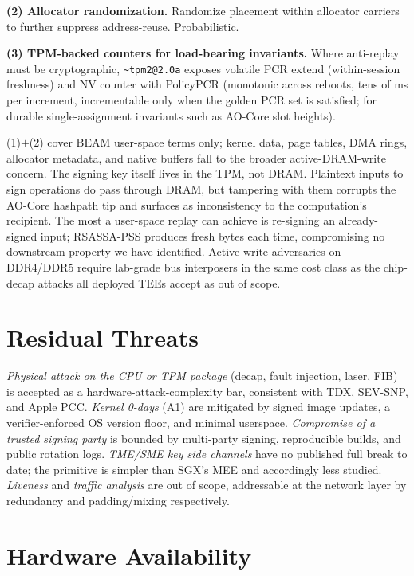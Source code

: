 \documentclass[10pt,a4paper]{article}
\begin{document}
\textbf{(2) Allocator randomization.} Randomize placement within
allocator carriers to further suppress address-reuse. Probabilistic.

\textbf{(3) TPM-backed counters for load-bearing invariants.} Where
anti-replay must be cryptographic, \texttt{\~{}tpm2@2.0a} exposes
volatile PCR extend (within-session freshness) and NV counter with
PolicyPCR (monotonic across reboots, tens of ms per increment,
incrementable
only when the golden PCR set is satisfied; for durable single-assignment
invariants such as AO-Core slot heights).

(1)$+$(2) cover BEAM user-space terms only; kernel data, page tables,
DMA rings, allocator metadata, and native buffers fall to the broader
active-DRAM-write concern. The signing key itself lives in the TPM, not
DRAM. Plaintext inputs to sign operations do pass through DRAM, but
tampering with them corrupts the AO-Core hashpath tip and surfaces as
inconsistency to the computation's recipient. The most a user-space
replay can achieve is re-signing an already-signed input; RSASSA-PSS
produces fresh bytes each time, compromising no downstream property
we have identified. Active-write adversaries on DDR4/DDR5 require
lab-grade bus interposers in the same cost class as the chip-decap
attacks all deployed TEEs accept as out of scope.

\vspace{-0.3em}
\section{Residual Threats}
\vspace{-0.3em}

\emph{Physical attack on the CPU or TPM package} (decap, fault injection,
laser, FIB) is accepted as a hardware-attack-complexity bar, consistent
with TDX, SEV-SNP, and Apple PCC. \emph{Kernel 0-days} (A1) are mitigated
by signed image updates, a verifier-enforced OS version floor, and minimal
userspace. \emph{Compromise of a trusted signing party} is bounded by
multi-party signing, reproducible builds, and public rotation logs.
\emph{TME/SME key side channels} have no published full break to date; the
primitive is simpler than SGX's MEE and accordingly less studied.
\emph{Liveness} and \emph{traffic analysis} are out of scope, addressable
at the network layer by redundancy and padding/mixing respectively.

\vspace{-0.3em}
\section{Hardware Availability}
\label{sec:availability}
\vspace{-0.3em}
\end{document}
